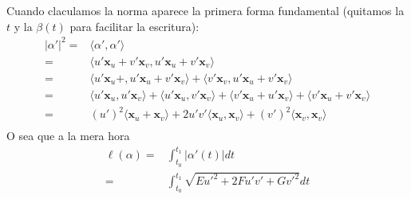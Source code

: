 \documentclass[spanish]{book}
\theoremstyle{definition}
\begin{document}
Cuando claculamos la norma aparece la primera forma fundamental (quitamos la $t$ y la $\beta(t)$ para facilitar la escritura):
\begin{align*}
	|\alpha'|^2=&\langle \alpha',\alpha'\rangle\\
	=&\langle u'\mathbf{x}_u+v'\mathbf{x}_v ,u'\mathbf{x}_u+v'\mathbf{x}_v\rangle\\
	=&\langle u'\mathbf{x}_u+,u'\mathbf{x}_u+v'\mathbf{x}_v\rangle+\langle v'\mathbf{x}_v,u'\mathbf{x}_u+v'\mathbf{x}_v\rangle\\
	=&\langle u'\mathbf{x}_u,u'\mathbf{x}_v\rangle+\langle u'\mathbf{x}_u,v'\mathbf{x}_v\rangle+\langle v'\mathbf{x}_u+u'\mathbf{x}_v\rangle+\langle v'\mathbf{x}_u+v'\mathbf{x}_v\rangle\\
	=&(u')^2\langle\mathbf{x}_u+\mathbf{x}_v\rangle+2u'v'\langle \mathbf{x}_u,\mathbf{x}_v\rangle+(v')^2\langle \mathbf{x}_v,\mathbf{x}_v\rangle\\
\end{align*}
O sea que a la mera hora
\begin{align*}
	\ell(\alpha)=&\int_{t_0}^{t_1}|\alpha'(t)|dt\\
	=&\int_{t_0}^{t_1}\sqrt{Eu'^2+2Fu'v'+Gv'^2}dt
\end{align*}
\end{document}
